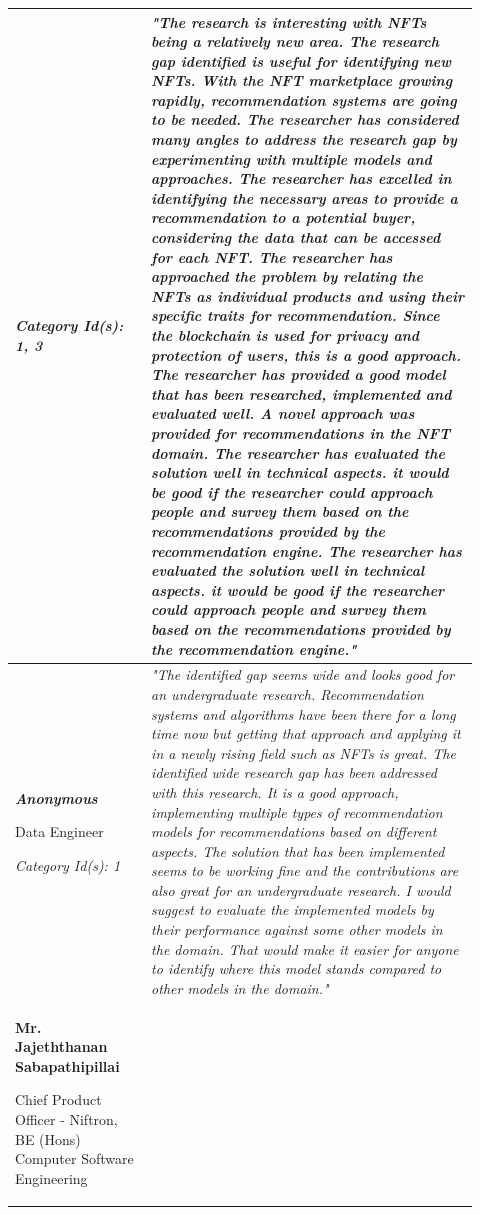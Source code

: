 \begin{longtable}{|p{0.27\linewidth}|p{0.655\linewidth}|}
\textit{Category Id(s): 1, 3}
 & 
 \textit{"The research is interesting with NFTs being a relatively new area. The research gap identified is useful for identifying new NFTs. With the NFT marketplace growing rapidly, recommendation systems are going to be needed. The researcher has considered many angles to address the research gap by experimenting with multiple models and approaches. The researcher has excelled in identifying the necessary areas to provide a recommendation to a potential buyer, considering the data that can be accessed for each NFT. The researcher has approached the problem by relating the NFTs as individual products and using their specific traits for recommendation. Since the blockchain is used for privacy and protection of users, this is a good approach. The researcher has provided a good model that has been researched, implemented and evaluated well. A novel approach was provided for recommendations in the NFT domain. The researcher has evaluated the solution well in technical aspects. it would be good if the researcher could approach people and survey them based on the recommendations provided by the recommendation engine. The researcher has evaluated the solution well in technical aspects. it would be good if the researcher could approach people and survey them based on the recommendations provided by the recommendation engine."}
 \\
\hline
\textbf{\textit{Anonymous}}

Data Engineer

\textit{Category Id(s): 1}
&
\textit{"The identified gap seems wide and looks good for an undergraduate research. Recommendation systems and algorithms have been there for a long time now but getting that approach and applying it in a newly rising field such as NFTs is great. The identified wide research gap has been addressed with this research. It is a good approach, implementing multiple types of recommendation models for recommendations based on different aspects. The solution that has been implemented seems to be working fine and the contributions are also great for an undergraduate research. I would suggest to evaluate the implemented models by their performance against some other models in the domain. That would make it easier for anyone to identify where this model stands compared to other models in the domain."}
\\
\hline
\textbf{Mr. Jajeththanan Sabapathipillai}

Chief Product Officer - Niftron, BE (Hons) Computer Software Engineering


\end{longtable}
